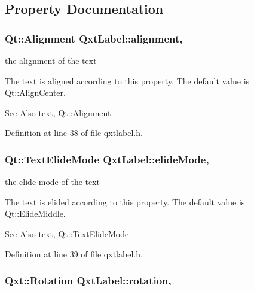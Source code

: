 \subsection{Property Documentation}
\hypertarget{class_qxt_label_a567b7e5e6a5ef51f72369198fd29b80f}{
\subsubsection[{alignment}]{\setlength{\rightskip}{0pt plus 5cm}Qt\-::\-Alignment Qxt\-Label\-::alignment\hspace{0.3cm}{\ttfamily [read]}, {\ttfamily [write]}}}\label{class_qxt_label_a567b7e5e6a5ef51f72369198fd29b80f}


the alignment of the text 

The text is aligned according to this property. The default value is Qt\-::\-Align\-Center.

\begin{DoxySeeAlso}{See Also}
\hyperlink{class_qxt_label_a62d0ce110fe3e51ea6ea82cd8e60d430}{text}, Qt\-::\-Alignment 
\end{DoxySeeAlso}


Definition at line 38 of file qxtlabel.\-h.

\hypertarget{class_qxt_label_a1af8965c7a5ca2605fdeb7c99cb41ad1}{
\subsubsection[{elide\-Mode}]{\setlength{\rightskip}{0pt plus 5cm}Qt\-::\-Text\-Elide\-Mode Qxt\-Label\-::elide\-Mode\hspace{0.3cm}{\ttfamily [read]}, {\ttfamily [write]}}}\label{class_qxt_label_a1af8965c7a5ca2605fdeb7c99cb41ad1}


the elide mode of the text 

The text is elided according to this property. The default value is Qt\-::\-Elide\-Middle.

\begin{DoxySeeAlso}{See Also}
\hyperlink{class_qxt_label_a62d0ce110fe3e51ea6ea82cd8e60d430}{text}, Qt\-::\-Text\-Elide\-Mode 
\end{DoxySeeAlso}


Definition at line 39 of file qxtlabel.\-h.

\hypertarget{class_qxt_label_afac17750ce1b4f63bf868dd239aeb2f2}{
\subsubsection[{rotation}]{\setlength{\rightskip}{0pt plus 5cm}Qxt\-::\-Rotation Qxt\-Label\-::rotation\hspace{0.3cm}{\ttfamily [read]}, {\ttfamily [write]}}}\label{class_qxt_label_afac17750ce1b4f63bf868dd239aeb2f2}


